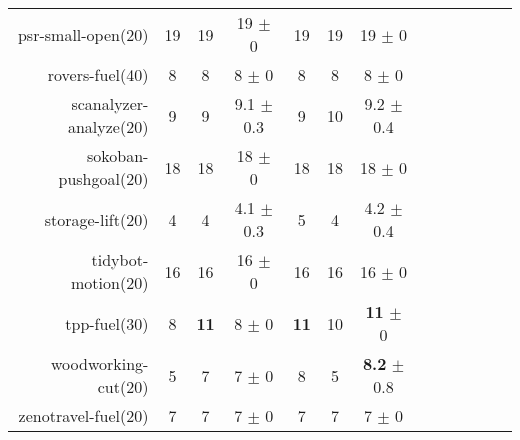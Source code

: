 \begin{center}
\begin{tabular}{|r|*{4}{ccc|}}
psr-small-open(20) & 19 & 19 & 19 \(\pm\) 0 & 19 & 19 & 19 \(\pm\) 0\\
rovers-fuel(40) & 8 & 8 & 8 \(\pm\) 0 & 8 & 8 & 8 \(\pm\) 0\\
scanalyzer-analyze(20) & 9 & 9 & 9.1 \(\pm\) 0.3 & 9 & 10 & 9.2 \(\pm\) 0.4\\
sokoban-pushgoal(20) & 18 & 18 & 18 \(\pm\) 0 & 18 & 18 & 18 \(\pm\) 0\\
storage-lift(20) & 4 & 4 & 4.1 \(\pm\) 0.3 & 5 & 4 & 4.2 \(\pm\) 0.4\\
tidybot-motion(20) & 16 & 16 & 16 \(\pm\) 0 & 16 & 16 & 16 \(\pm\) 0\\
tpp-fuel(30) & 8 & \textbf{11} & 8 \(\pm\) 0 & \textbf{11} & 10 & \textbf{11} \(\pm\) 0\\
woodworking-cut(20) & 5 & 7 & 7 \(\pm\) 0 & 8 & 5 & \textbf{8.2} \(\pm\) 0.8\\
zenotravel-fuel(20) & 7 & 7 & 7 \(\pm\) 0 & 7 & 7 & 7 \(\pm\) 0\\
\end{tabular}
\end{center}

